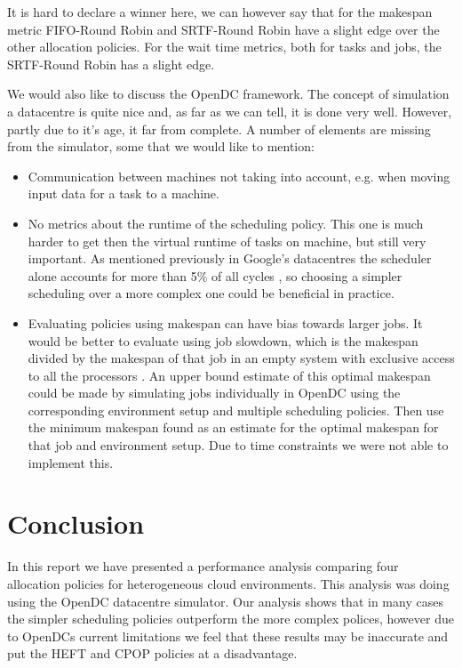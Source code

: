 \documentclass[twocolumn,a4]{scrartcl}
\begin{document}
It is hard to declare a winner here, we can however say that for the makespan metric FIFO-Round Robin and SRTF-Round Robin have a slight edge over the other allocation policies. For the wait time metrics, both for tasks and jobs, the SRTF-Round Robin has a slight edge.

We would also like to discuss the OpenDC framework. The concept of simulation a datacentre is quite nice and, as far as we can tell, it is done very well. However, partly due to it's age, it far from complete. A number of elements are missing from the simulator, some that we would like to mention:

\begin{itemize}
    \item Communication between machines not taking into account, e.g. when moving input data for a task to a machine.
    \item No metrics about the runtime of the scheduling policy. This one is much harder to get then the virtual runtime of tasks on machine, but still very important. As mentioned previously in Google's datacentres the scheduler alone accounts for more than 5\% of all  cycles \cite{DBLP:conf/isca/KanevDHRMWB15}, so choosing a simpler scheduling over a more complex one could be beneficial in practice.
    \item Evaluating policies using makespan can have bias towards larger jobs. It would be better to evaluate using job slowdown, which is the makespan divided by the makespan of that job in an empty system with exclusive access to all the processors \cite{DBLP:conf/ccgrid/IlyushkinGE15}. An upper bound estimate of this optimal makespan could be made by simulating jobs individually in OpenDC using the corresponding environment setup and multiple scheduling policies. Then use the minimum makespan found as an estimate for the optimal makespan for that job and environment setup. Due to time constraints we were not able to implement this.
\end{itemize}



\section{Conclusion} \label{sec_conclusion}

In this report we have presented a performance analysis comparing four allocation policies for heterogeneous cloud environments. This analysis was doing using the OpenDC datacentre simulator. Our analysis shows that in many cases the simpler scheduling policies outperform the more complex polices, however due to OpenDCs current limitations we feel that these results may be inaccurate and put the HEFT and CPOP policies at a disadvantage.
\end{document}
